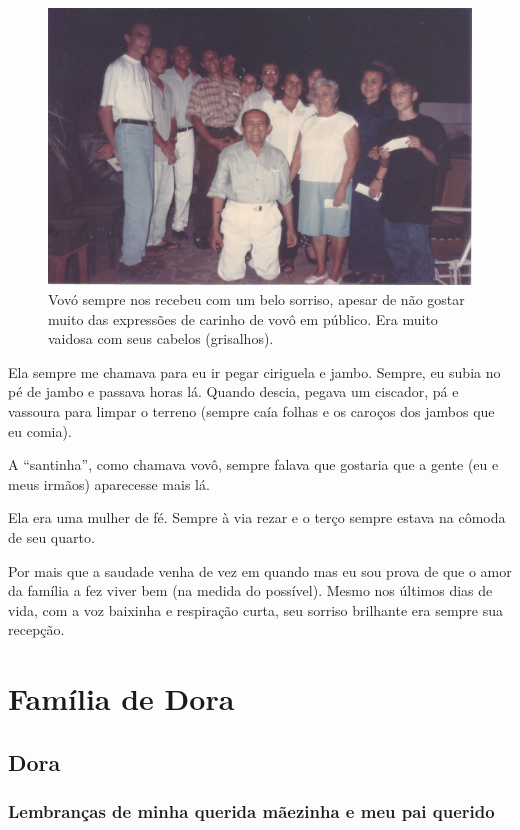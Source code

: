 \documentclass[
  brazil,
  a6paper,
  oneside,
  landscape,
  14pt]{scrbook}
\begin{document}
\begin{figure}
\centering
\includegraphics{img/dudu/wagner.png}
\caption{Vovó sempre nos recebeu com um belo sorriso, apesar de não
gostar muito das expressões de carinho de vovô em público. Era muito
vaidosa com seus cabelos (grisalhos).}
\end{figure}

Ela sempre me chamava para eu ir pegar ciriguela e jambo. Sempre, eu
subia no pé de jambo e passava horas lá. Quando descia, pegava um
ciscador, pá e vassoura para limpar o terreno (sempre caía folhas e os
caroços dos jambos que eu comia).

A ``santinha'', como chamava vovô, sempre falava que gostaria que a
gente (eu e meus irmãos) aparecesse mais lá.

Ela era uma mulher de fé. Sempre à via rezar e o terço sempre estava na
cômoda de seu quarto.

Por mais que a saudade venha de vez em quando mas eu sou prova de que o
amor da família a fez viver bem (na medida do possível). Mesmo nos
últimos dias de vida, com a voz baixinha e respiração curta, seu sorriso
brilhante era sempre sua recepção.

\hypertarget{famuxedlia-de-dora}{%
\chapter{Família de Dora}\label{famuxedlia-de-dora}}

\hypertarget{dora}{%
\section{Dora}\label{dora}}

\hypertarget{lembranuxe7as-de-minha-querida-muxe3ezinha-e-meu-pai-querido}{%
\subsection{Lembranças de minha querida mãezinha e meu pai
querido}\label{lembranuxe7as-de-minha-querida-muxe3ezinha-e-meu-pai-querido}}
\end{document}
